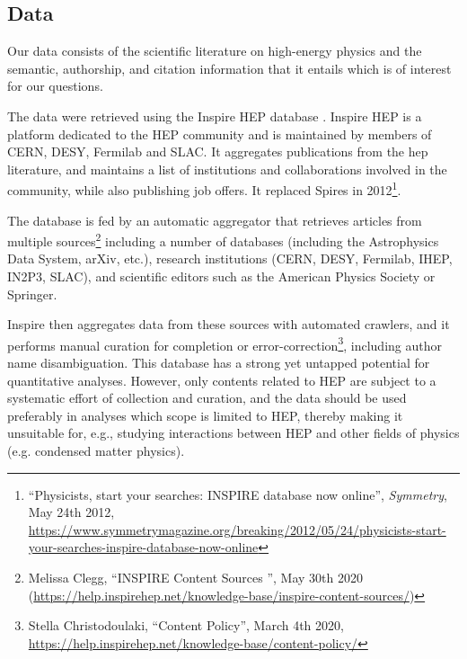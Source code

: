 \documentclass[smallextended]{svjour3}
\begin{document}
\subsection{Data\label{section:data}}


Our data consists of the scientific literature on high-energy physics and the semantic, authorship, and citation information that it entails which is of interest for our questions.
 
The data were retrieved using the Inspire HEP database \citep{InspireAPI}. Inspire HEP is a platform dedicated to the HEP community and is maintained by members of CERN, DESY, Fermilab and SLAC. It aggregates publications from the \gls{hep} literature, and maintains a list of institutions and collaborations involved in the community, while also publishing job offers. It replaced Spires in 2012\footnote{``Physicists, start your searches: INSPIRE database now online'', \textit{Symmetry}, May 24th 2012, \url{https://www.symmetrymagazine.org/breaking/2012/05/24/physicists-start-your-searches-inspire-database-now-online}
}.

The database is fed by an automatic aggregator that retrieves articles from multiple sources\footnote{Melissa Clegg, ``INSPIRE Content Sources
'', May 30th 2020 (\url{https://help.inspirehep.net/knowledge-base/inspire-content-sources/})} including a number of databases (including the Astrophysics Data System, arXiv, etc.), research institutions (CERN, DESY, Fermilab, IHEP, IN2P3, SLAC), and scientific editors such as the American Physics Society or Springer.

Inspire then aggregates data from these sources with automated crawlers, and it performs manual curation for completion or error-correction\footnote{Stella Christodoulaki, ``Content Policy'', March 4th 2020, \url{https://help.inspirehep.net/knowledge-base/content-policy/}}, including author name disambiguation. This database has a strong yet untapped potential for quantitative analyses. However, only contents related to HEP are subject to a systematic effort of collection and curation, and the data should be used preferably in analyses which scope is limited to HEP, thereby making it unsuitable for, e.g., studying interactions between HEP and other fields of physics (e.g. condensed matter physics).%
\end{document}
